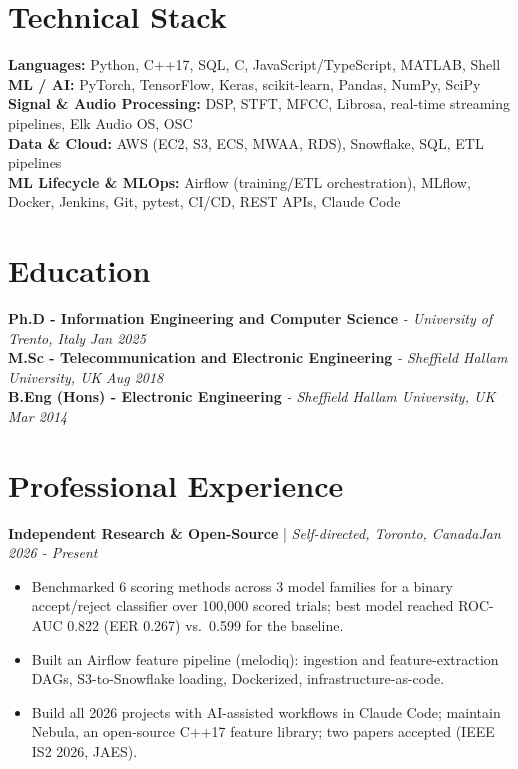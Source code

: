 \documentclass[11pt]{article}
\newenvironment{cvrole}[5]{%
  \par\noindent\textbf{\large #1} | \textit{\small #2, #3}\hfill \textit{\small #4 - #5}\par
  \begin{itemize}[leftmargin=2em, itemsep=-0.3em, topsep=-0.5em]%
}{%
  \end{itemize}\par\noindent\mbox{}\par\vspace{0.1em}%
}
\begin{document}
\section*{Technical Stack}
\textbf{Languages:} Python, C++17, SQL, C, JavaScript/TypeScript, MATLAB, Shell\\
\textbf{ML / AI:} PyTorch, TensorFlow, Keras, scikit-learn, Pandas, NumPy, SciPy\\
\textbf{Signal \& Audio Processing:} DSP, STFT, MFCC, Librosa, real-time streaming pipelines, Elk Audio OS, OSC\\
\textbf{Data \& Cloud:} AWS (EC2, S3, ECS, MWAA, RDS), Snowflake, SQL, ETL pipelines\\
\textbf{ML Lifecycle \& MLOps:} Airflow (training/ETL orchestration), MLflow, Docker, Jenkins, Git, pytest, CI/CD, REST APIs, Claude Code

\section*{Education}
\textbf{Ph.D - Information Engineering and Computer Science} \textit{\small{ - University of Trento, Italy}} \hfill \textit{Jan 2025}\\[2pt]
\noindent\textbf{M.Sc - Telecommunication and Electronic Engineering} \textit{\small{ - Sheffield Hallam University, UK}} \hfill \textit{Aug 2018}\\[2pt]
\noindent\textbf{B.Eng (Hons) - Electronic Engineering} \textit{\small{ - Sheffield Hallam University, UK}} \hfill \textit{Mar 2014}

\section*{Professional Experience}

\begin{cvrole}{Independent Research \& Open-Source}{Self-directed}{Toronto, Canada}{Jan 2026}{Present}
    \item Benchmarked 6 scoring methods across 3 model families for a binary accept/reject classifier over 100,000 scored trials; best model reached ROC-AUC 0.822 (EER 0.267) vs.\ 0.599 for the baseline.
    \item Built an Airflow feature pipeline (melodiq): ingestion and feature-extraction DAGs, S3-to-Snowflake loading, Dockerized, infrastructure-as-code.
    \item Build all 2026 projects with AI-assisted workflows in Claude Code; maintain Nebula, an open-source C++17 feature library; two papers accepted (IEEE IS2 2026, JAES).
\end{cvrole}
\end{document}
